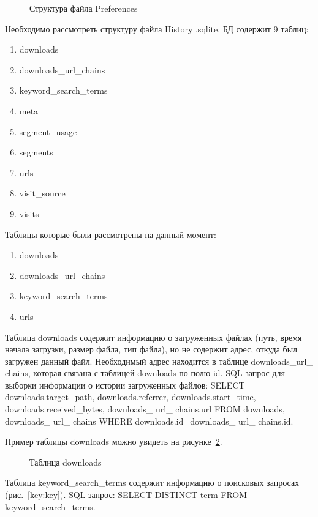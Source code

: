 \begin{figure}[h!]
\caption{Структура файла Preferences}
\label{preferences:preferences}
\end{figure}

Необходимо рассмотреть структуру файла History .sqlite. БД содержит 9 таблиц:
\begin{enumerate}
  \item downloads
  \item downloads\_url\_chains
  \item keyword\_search\_terms
  \item meta
  \item segment\_usage
  \item segments
  \item urls
  \item visit\_source
  \item visits 
\end{enumerate}


Таблицы которые были рассмотрены на данный момент: 
\begin{enumerate}
  \item downloads
  \item downloads\_url\_chains
  \item keyword\_search\_terms
  \item urls
\end{enumerate} 


Таблица downloads содержит информацию о загруженных файлах (путь, время начала загрузки, размер файла, тип файла), но не содержит адрес, откуда был загружен данный файл. Необходимый адрес находится в таблице downloads\_url\_ chains, которая  связана с таблицей downloads по полю id. 
SQL запрос для выборки информации о истории загруженных файлов: SELECT downloads.target\_path, downloads.referrer, downloads.start\_time, downloads.received\_bytes,
downloads\_ url\_ chains.url FROM downloads, downloads\_ url\_ chains WHERE downloads.id=downloads\_ url\_ chains.id.


Пример таблицы downloads можно увидеть на рисунке~\ref{down:down}.

\begin{figure}[h!]
\caption{Таблица downloads}
\label{down:down}
\end{figure}

Таблица  keyword\_search\_terms содержит информацию о поисковых запросах (рис.~\ref{key:key}). SQL запрос: SELECT DISTINCT term FROM keyword\_search\_terms.

